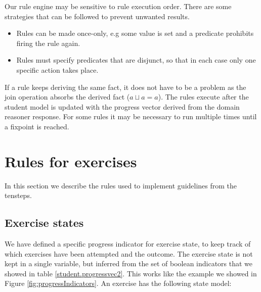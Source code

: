 Our rule engine may be sensitive to rule execution order. 
There are some strategies that can be followed to prevent unwanted results.
 \begin{itemize}
\item Rules can be made once-only, e.g some value is set and a predicate prohibits firing the rule again.
\item Rules must specify predicates that are disjunct, so that in each case only one specific action takes place.
\end{itemize}

If a rule keeps deriving the same fact, it does not have to be a problem as the join operation absorbs the derived fact ($ a \sqcup a = a $).
The rules execute after the student model is updated with the progress vector derived from the domain reasoner response.
For some rules it may be necessary to run multiple times until a fixpoint is reached.

\section{Rules for exercises}

In this section we describe the rules used to implement guidelines from the \gls{tensteps}.



\subsection{Exercise states}

We have defined a specific progress indicator for exercise state, to keep track of which exercises have been attempted and the outcome.
The exercise state is not kept in a single variable, but inferred from the set of boolean indicators that we showed in table \ref{student.progressvec2}.
This works like the example we showed in Figure \ref{fig:progressIndicators}.
An exercise has the following state model:


